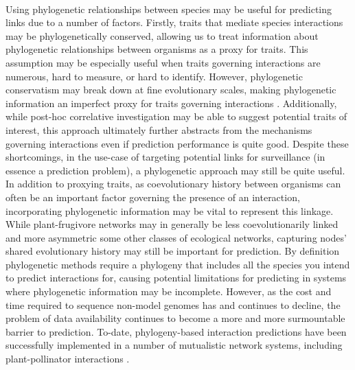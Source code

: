 \documentclass[openacc]{rsproca_new}%
\begin{document}
\paragraph*{}
Using phylogenetic relationships between species may be useful for predicting links due to a number of factors. Firstly, traits that mediate species interactions may be phylogenetically conserved, allowing us to treat information about phylogenetic relationships between organisms as a proxy for traits. This assumption may be especially useful when traits governing interactions are numerous, hard to measure, or hard to identify. However, phylogenetic conservatism may break down at fine evolutionary scales, making phylogenetic information an imperfect proxy for traits governing interactions \cite{rafferty2013}. Additionally, while post-hoc correlative investigation may be able to suggest potential traits of interest, this approach ultimately further abstracts from the mechanisms governing interactions even if prediction performance is quite good. Despite these shortcomings, in the use-case of targeting potential links for surveillance (in essence a prediction problem), a phylogenetic approach may still be quite useful. In addition to proxying traits, as coevolutionary history between organisms can often be an important factor governing the presence of an interaction, incorporating phylogenetic information may be vital to represent this linkage. While plant-frugivore networks may in generally be less coevolutionarily linked and more asymmetric some other classes of ecological networks\cite{maglianesi2024phylogenetic, jordano1987patterns, wheelwright1982seed}, capturing nodes' shared evolutionary history may still be important for prediction. By definition phylogenetic methods require a phylogeny that includes all the species you intend to predict interactions for, causing potential limitations for predicting in systems where phylogenetic information may be incomplete. However, as the cost and time required to sequence non-model genomes has and continues to decline, the problem of data availability continues to become a more and more surmountable barrier to prediction. To-date, phylogeny-based interaction predictions have been successfully implemented in a number of mutualistic network systems, including plant-pollinator interactions \cite{Braga21}.
\end{document}
